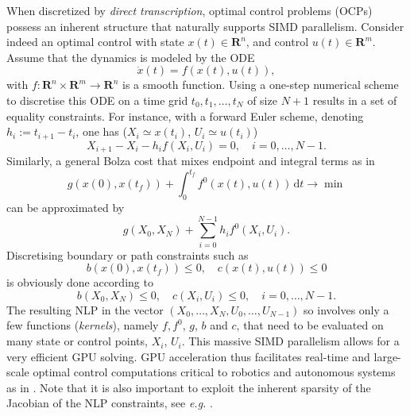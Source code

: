 \documentclass[twoside,leqno,twocolumn]{article}
\begin{document}
When discretized by \emph{direct transcription}, optimal control problems (OCPs) possess an inherent structure that naturally supports SIMD parallelism. 
Consider indeed an optimal control with state $x(t) \in \mathbf{R}^n$, and control $u(t) \in \mathbf{R}^m$. Assume that the dynamics is modeled by the ODE
$$ \dot{x}(t) = f(x(t), u(t)), $$
with $f : \mathbf{R}^n \times \mathbf{R}^m \to \mathbf{R}^n$ is a smooth function. Using a one-step numerical scheme to discretise this ODE on a time grid $t_0, t_1, \dots, t_N$ of size $N + 1$ results in a set of equality constraints. For instance, with a forward Euler scheme, denoting $h_i := t_{i+1} - t_i$, one has ($X_i \simeq x(t_i)$, $U_i \simeq u(t_i)$)
$$ X_{i+1} - X_i - h_i f(X_i, U_i) = 0,\quad i = 0, \dots, N-1. $$
Similarly, a general Bolza cost that mixes endpoint and integral terms as in
$$ g(x(0), x(t_f)) + \int_0^{t_f} f^0(x(t), u(t))\,\mathrm{d}t \to \min $$
can be approximated by
$$ g(X_0, X_N) + \sum_{i=0}^{N-1} h_i f^0(X_i, U_i). $$
Discretising boundary or path constraints such as
$$ b(x(0),x(t_f)) \leq 0,\quad c(x(t), u(t)) \leq 0 $$
is obviously done according to
$$ b(X_0, X_N) \leq 0, \quad c(X_i, U_i) \leq 0,\quad i = 0, \dots, N-1. $$
The resulting NLP in the vector $(X_0,\dots,X_N,U_0,\dots,U_{N-1})$
so involves only a few functions (\emph{kernels}), namely $f, f^0$, $g$, $b$ and $c$, that need to be evaluated on many state or control points, $X_i$, $U_i$.
This massive SIMD parallelism allows for a very efficient GPU solving. GPU acceleration thus facilitates real-time and large-scale optimal control computations critical to robotics and autonomous systems as in \cite{pacaud2024gpu}.
Note that it is also important to exploit the inherent sparsity of the Jacobian of the NLP constraints, see \emph{e.g.} \cite{alexis-xxxx}.


\end{document}
